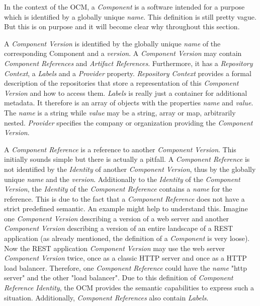 \noindent In the context of the OCM, a \emph{Component} is a software intended for a purpose which is identified by a globally unique \emph{name}. This definition is still pretty vague. But this is on purpose and it will become clear why throughout this section.\par 
\noindent A \emph{Component Version} is identified by the globally unique \emph{name} of the corresponding Component and a \emph{version}. A \emph{Component Version} may contain \emph{Component References} and \emph{Artifact References}. Furthermore, it has a \emph{Repository Context}, a \emph{Labels} and a \emph{Provider} property. \emph{Repository Context} provides a formal description of the repositories that store a representation of this \emph{Component Version} and how to access them. \emph{Labels} is really just a container for additional metadata. It therefore is an array of objects with the properties \emph{name} and \emph{value}. The \emph{name} is a string while \emph{value} may be a string, array or map, arbitrarily nested. \emph{Provider} specifies the company or organization providing the \emph{Component Version}.\par 
\noindent A \emph{Component Reference} is a reference to another \emph{Component Version}. This initially sounds simple but there is actually a pitfall. A \emph{Component Reference} is not identified by the \emph{Identity} of another \emph{Component Version}, thus by the globally unique \emph{name} and the \emph{version}. Additionally to the \emph{Identity} of the \emph{Component Version}, the \emph{Identity} of the \emph{Component Reference}  contains a \emph{name} for the reference. This is due to the fact that a \emph{Component Reference} does not have a strict predefined semantic. An example might help to understand this. Imagine one \emph{Component Version} describing a version of a web server and another \emph{Component Version} describing a version of an entire landscape of a REST application (as already mentioned, the definition of a \emph{Component} is very loose). Now the REST application \emph{Component Version} may use the web server \emph{Component Version} twice, once as a classic HTTP server and once as a HTTP load balancer. Therefore, one \emph{Component Reference} could have the \emph{name} "http server" and the other "load balancer". Due to this definition of \emph{Component Reference Identity}, the OCM provides the semantic capabilities to express such a situation. Additionally, \emph{Component References} also contain \emph{Labels}.\par 

